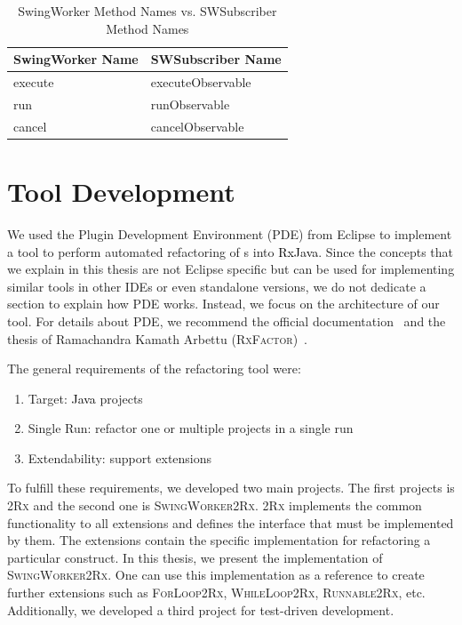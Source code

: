 \documentclass[type=bsc,accentcolor=tud9c]{tudthesis}
\newcommand{\framework}[1]{\textcolor{black}{#1}}
\newcommand{\toolcore}{\textsc{2Rx}}
\newcommand{\toolextension}{\textsc{SwingWorker2Rx}}
\begin{document}
\begin{table}[H]
\begin{center}
\begin{tabular}{|C{5cm}|C{5cm}|}
\hline
\bf SwingWorker Name & \bf SWSubscriber Name\\\hline
execute & executeObservable\\\hline
run & runObservable\\\hline
cancel & cancelObservable\\\hline
\end{tabular}
\end{center}
\caption{SwingWorker Method Names vs. SWSubscriber Method Names}
\label{table:origNamesVsNewNames}
\end{table}

\section{Tool Development}
We used the Plugin Development Environment (PDE) from Eclipse to implement a tool to perform automated refactoring of s into \framework{RxJava}. Since the concepts that we explain in this thesis are not Eclipse specific but can be used for implementing similar tools in other IDEs or even standalone versions, we do not dedicate a section to explain how PDE works. Instead, we focus on the architecture of our tool. For details about PDE, we recommend the official documentation~\cite{pdeEclipse} and the thesis of Ramachandra Kamath Arbettu (\textsc{RxFactor})~\cite{thesisRxFactor}.

The general requirements of the refactoring tool were:
\begin{enumerate}
	\item Target: \framework{Java} projects
	\item Single Run: refactor one or multiple projects in a single run
	\item Extendability: support extensions
\end{enumerate}

To fulfill these requirements, we developed two main projects. The first projects is \toolcore{} and the second one is \toolextension{}. \toolcore{} implements the common functionality to all extensions and defines the interface that must be implemented by them. The extensions contain the specific implementation for refactoring a particular construct. In this thesis, we present the implementation of \toolextension{}. One can use this implementation as a reference to create further extensions such as \textsc{ForLoop2Rx}, \textsc{WhileLoop2Rx}, \textsc{Runnable2Rx}, etc. Additionally, we developed a third project for test-driven development.
\end{document}
